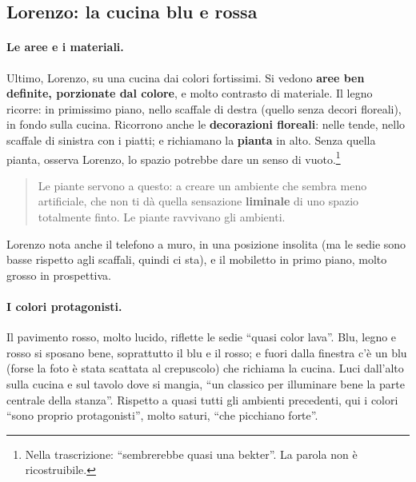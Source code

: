 \subsection{Lorenzo: la cucina blu e rossa}

\paragraph{Le aree e i materiali.} Ultimo, Lorenzo, su una cucina dai colori fortissimi.
Si vedono \textbf{aree ben definite, porzionate dal colore}, e molto contrasto di
materiale. Il legno ricorre: in primissimo piano, nello scaffale di destra (quello senza
decori floreali), in fondo sulla cucina. Ricorrono anche le \textbf{decorazioni
floreali}: nelle tende, nello scaffale di sinistra con i piatti; e richiamano la
\textbf{pianta} in alto. Senza quella pianta, osserva Lorenzo, lo spazio potrebbe dare un
senso di vuoto.\footnote{Nella trascrizione: ``sembrerebbe quasi una bekter''. La parola
non è ricostruibile.}
\begin{quote}
Le piante servono a questo: a creare un ambiente che sembra meno artificiale, che non ti
dà quella sensazione \textbf{liminale} di uno spazio totalmente finto. Le piante
ravvivano gli ambienti.
\end{quote}
Lorenzo nota anche il telefono a muro, in una posizione insolita (ma le sedie sono basse
rispetto agli scaffali, quindi ci sta), e il mobiletto in primo piano, molto grosso in
prospettiva.

\paragraph{I colori protagonisti.} Il pavimento rosso, molto lucido, riflette le sedie
``quasi color lava''. Blu, legno e rosso si sposano bene, soprattutto il blu e il rosso;
e fuori dalla finestra c'è un blu (forse la foto è stata scattata al crepuscolo) che
richiama la cucina. Luci dall'alto sulla cucina e sul tavolo dove si mangia, ``un classico
per illuminare bene la parte centrale della stanza''. Rispetto a quasi tutti gli ambienti
precedenti, qui i colori ``sono proprio protagonisti'', molto saturi, ``che picchiano
forte''.


